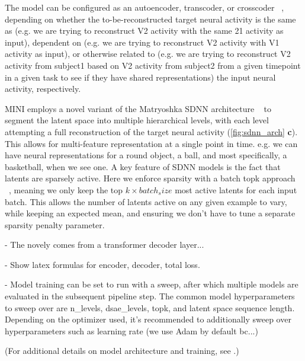 The model can be configured as an autoencoder, transcoder, or crosscoder ~\cite{lindsey_2024_crosscoders}, depending on whether the to-be-reconstructed target neural activity is the same as (e.g. we are trying to reconstruct V2 activity with the same 21 activity as input), dependent on (e.g. we are trying to reconstruct V2 activity with V1 activity as input), or otherwise related to (e.g. we are trying to reconstruct V2 activity from subject1 based on V2 activity from subject2 from a given timepoint in a given task to see if they have shared representations) the input neural activity, respectively.

MINI employs a novel variant of the Matryoshka SDNN architecture ~\cite{bussmann_2025_msae} to segment the latent space into multiple hierarchical levels, with each level attempting a full reconstruction of the target neural activity (\autoref{fig:sdnn_arch} \textbf{c}). This allows for multi-feature representation at a single point in time. e.g. we can have neural representations for a round object, a ball, and most specifically, a basketball, when we see one. A key feature of SDNN models is the fact that latents are sparsely active. Here we enforce sparsity with a batch topk approach ~\cite{bussmann_2024_batchtopk}, meaning we only keep the top $k \times batch_size$ most active latents for each input batch. This allows the number of latents active on any given example to vary, while keeping an expected mean, and ensuring we don't have to tune a separate sparsity penalty parameter.

- The novely comes from a transformer decoder layer...

- Show latex formulas for encoder, decoder, total loss.

- Model training can be set to run with a sweep, after which multiple models are evaluated in the subsequent pipeline step. The common model hyperparameters to sweep over are n\_levels, dsae\_levels, topk, and latent space sequence length. Depending on the optimizer used, it's recommended to additionally sweep over hyperparameters such as learning rate (we use Adam by default bc...)

(For additional details on model architecture and training, see .)

